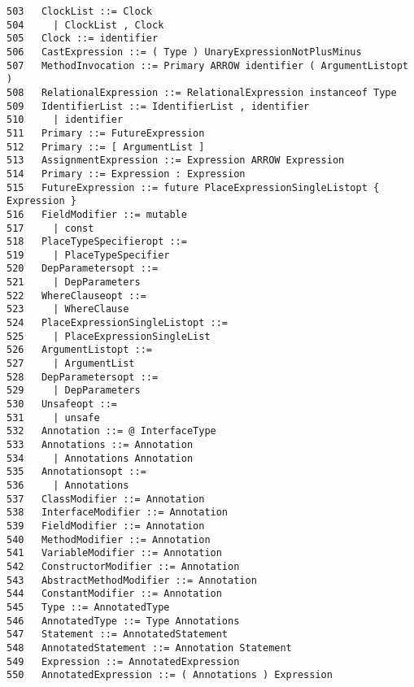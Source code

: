 {\begin{verbatim}
503   ClockList ::= Clock
504     | ClockList , Clock
505   Clock ::= identifier
506   CastExpression ::= ( Type ) UnaryExpressionNotPlusMinus
507   MethodInvocation ::= Primary ARROW identifier ( ArgumentListopt )
508   RelationalExpression ::= RelationalExpression instanceof Type
509   IdentifierList ::= IdentifierList , identifier
510     | identifier
511   Primary ::= FutureExpression
512   Primary ::= [ ArgumentList ]
513   AssignmentExpression ::= Expression ARROW Expression
514   Primary ::= Expression : Expression
515   FutureExpression ::= future PlaceExpressionSingleListopt { Expression }
516   FieldModifier ::= mutable
517     | const
518   PlaceTypeSpecifieropt ::=
519     | PlaceTypeSpecifier
520   DepParametersopt ::=
521     | DepParameters
522   WhereClauseopt ::=
523     | WhereClause
524   PlaceExpressionSingleListopt ::=
525     | PlaceExpressionSingleList
526   ArgumentListopt ::=
527     | ArgumentList
528   DepParametersopt ::=
529     | DepParameters
530   Unsafeopt ::=
531     | unsafe
532   Annotation ::= @ InterfaceType
533   Annotations ::= Annotation
534     | Annotations Annotation
535   Annotationsopt ::=
536     | Annotations
537   ClassModifier ::= Annotation
538   InterfaceModifier ::= Annotation
539   FieldModifier ::= Annotation
540   MethodModifier ::= Annotation
541   VariableModifier ::= Annotation
542   ConstructorModifier ::= Annotation
543   AbstractMethodModifier ::= Annotation
544   ConstantModifier ::= Annotation
545   Type ::= AnnotatedType
546   AnnotatedType ::= Type Annotations
547   Statement ::= AnnotatedStatement
548   AnnotatedStatement ::= Annotation Statement
549   Expression ::= AnnotatedExpression
550   AnnotatedExpression ::= ( Annotations ) Expression
\end{verbatim}
}
\twocolumn
